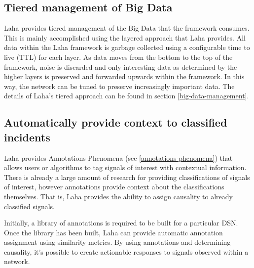 \subsection{Tiered management of Big Data}

Laha provides tiered management of the Big Data that the framework consumes. This is mainly accomplished using the layered approach that Laha provides. All data within the Laha framework is garbage collected using a configurable time to live (TTL) for each layer. As data moves from the bottom to the top of the framework, noise is discarded and only interesting data as determined by the higher layers is preserved and forwarded upwards within the framework. In this way, the network can be tuned to preserve increasingly important data. The details of Laha's tiered approach can be found in section \ref{big-data-management}.

\subsection{Automatically provide context to classified incidents}
Laha provides Annotations Phenomena (see \ref{annotations-phenomena}) that allows users or algorithms to tag signals of interest with contextual information. There is already a large amount of research for providing classifications of signals of interest, however annotations provide context about the classifications themselves. That is, Laha provides the ability to assign causality to already classified signals.

Initially, a library of annotations is required to be built for a particular DSN. Once the library has been built, Laha can provide automatic annotation assignment using similarity metrics. By using annotations and determining causality, it's possible to create actionable responses to signals observed within a network.

